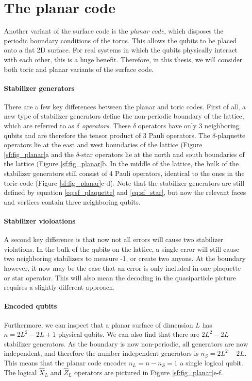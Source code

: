 \section{The planar code}\label{sec:surface_planar}
Another variant of the surface code is the \emph{planar code}, which disposes the periodic boundary conditions of the torus. This allows the qubits to be placed onto a flat 2D surface. For real systems in which the qubits physically interact with each other, this is a huge benefit. Therefore, in this thesis, we will consider both toric and planar variants of the surface code.


\paragraph{Stabilizer generators}
There are a few key differences between the planar and toric codes. First of all, a new type of stabilizer generators define the non-periodic boundary of the lattice, which are referred to as \emph{$\delta$ operators}. These $\delta$ operators have only 3 neighboring qubits and are therefore the tensor product of 3 Pauli operators. The $\delta$-plaquette operators lie at the east and west boundaries of the lattice (Figure \ref{sf:fig_planar}a and the $\delta$-star operators lie at the north and south boundaries of the lattice (Figure \ref{sf:fig_planar}b. In the middle of the lattice, the bulk of the stabilizer generators still consist of 4 Pauli operators, identical to the ones in the toric code (Figure \ref{sf:fig_planar}c-d). Note that the stabilizer generators are still defined by equation \eqref{eq:sf_plaquette} and \eqref{eq:sf_star}, but now the relevant faces and vertices contain three neighboring qubits.

\paragraph{Stabilizer violoations}
A second key difference is that now not all errors will cause two stabilizer violations. In the bulk of the qubits on the lattice, a single error will still cause two neighboring stabilizers to measure -1, or create two anyons. At the boundary however, it now may be the case that an error is only included in one plaquette or star operator. This will also mean the decoding in the quasiparticle picture requires a slightly different approach.

\paragraph{Encoded qubits}
Furthermore, we can inspect that a planar surface of dimension $L$ has $n = 2L^2-2L+1$ physical qubits. We can also find that there are $2L^2-2L$ stabilizer generators. As the boundary is now non-periodic, all generators are now independent, and therefore the number independent generators is $n_S = 2L^2-2L$. This means that the planar code encodes $n_L = n-n_S = 1$ a single logical qubit. The logical $\hat{X}_L$ and $\hat{Z}_L$ operators are pictured in Figure \ref{sf:fig_planar}e-f.

